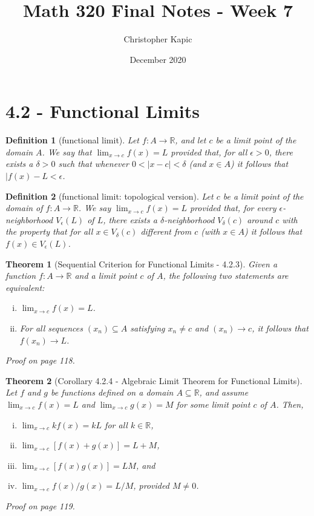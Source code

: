 \documentclass{article}
\title{Math 320 Final Notes - Week 7}
\author{Christopher Kapic}
\date{December 2020}
\newtheorem{definition}{Definition}
\newtheorem{theorem}{Theorem}
\begin{document}
\maketitle

\section*{4.2 - Functional Limits}
\begin{definition}[functional limit]
    Let $f:A\rightarrow \mathbb{R}$, and let $c$ be a limit point of the domain $A$. We say that $\lim _{x\rightarrow c}f(x)=L$ provided that, for all $\epsilon > 0$, there exists a $\delta > 0$ such that whenever $0 < |x-c| < \delta$ (and $x \in A$) it follows that $|f(x)-L < \epsilon$.
\end{definition}

\begin{definition}[functional limit: topological version]
    Let $c$ be a limit point of the domain of $f:A\rightarrow \mathbb{R}$. We say $\lim _{x\rightarrow c}f(x)=L$ provided that, for every $\epsilon$-neighborhood $V_\epsilon (L)$ of $L$, there exists a $\delta$-neighborhood $V_\delta (c)$ around $c$ with the property that for all $x \in V_\delta (c)$ different from $c$ (with $x \in A$) it follows that $f(x) \in V_\epsilon (L)$.
\end{definition}

\begin{theorem}[Sequential Criterion for Functional Limits - 4.2.3]
    Given a function $f:A\rightarrow \mathbb{R}$ and a limit point $c$ of $A$, the following two statements are equivalent:
    \begin{enumerate}[(i)]
        \item $\lim _{x\rightarrow c}f(x)=L$.
        \item For all sequences $(x_n) \subseteq A$ satisfying $x_n \neq c$ and $(x_n) \rightarrow c$, it follows that $f(x_n)\rightarrow L$.
    \end{enumerate}

    Proof on page 118.
\end{theorem}

\begin{theorem}[Corollary 4.2.4 - Algebraic Limit Theorem for Functional Limits]
    Let $f$ and $g$ be functions defined on a domain $A \subseteq \mathbb{R}$, and assume $\lim _{x\rightarrow c}f(x)=L$ and $\lim _{x\rightarrow c}g(x)=M$ for some limit point $c$ of $A$. Then,
    \begin{enumerate}[(i)]
        \item $\lim _{x\rightarrow c}kf(x)=kL$ for all $k \in \mathbb{R}$,
        \item $\lim _{x\rightarrow c}[f(x)+g(x)]=L+M$,
        \item $\lim _{x\rightarrow c}[f(x)g(x)]=LM$, and
        \item $\lim _{x\rightarrow c}f(x)/g(x) = L/M$, provided $M \neq 0$.
    \end{enumerate}

    Proof on page 119.
\end{theorem}
\end{document}
